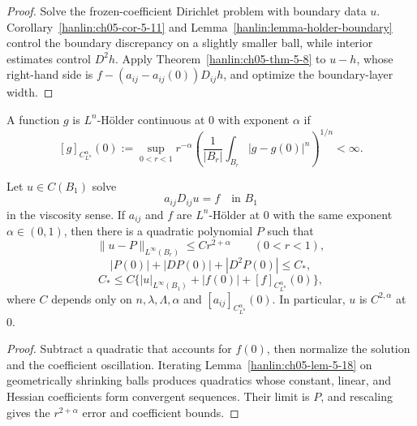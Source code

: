 \begin{proof}
\sketch Solve the frozen-coefficient Dirichlet problem with boundary data
$u$. Corollary~\ref{hanlin:ch05-cor-5-11} and
Lemma~\ref{hanlin:lemma-holder-boundary} control the boundary discrepancy on a
slightly smaller ball, while interior estimates control $D^2h$. Apply
Theorem~\ref{hanlin:ch05-thm-5-8} to $u-h$, whose right-hand side is
$f-(a_{ij}-a_{ij}(0))D_{ij}h$, and optimize the boundary-layer width.
\end{proof}


\begin{definition}\label{hanlin:ch05-def-5-19}
A function $g$ is $L^n$-Hölder continuous at $0$ with exponent $\alpha$ if
\[
[g]_{C^\alpha_{L^n}}(0)
:=\sup_{0<r<1}r^{-\alpha}
\left(\frac1{|B_r|}\int_{B_r}|g-g(0)|^n\right)^{1/n}<\infty.
\]
\end{definition}

\begin{theorem}\label{hanlin:ch05-thm-5-20}
Let $u\in C(B_1)$ solve
\[
a_{ij}D_{ij}u=f\quad\text{in }B_1
\]
in the viscosity sense. If $a_{ij}$ and $f$ are $L^n$-Hölder at $0$ with
the same exponent $\alpha\in(0,1)$, then there is a quadratic polynomial
$P$ such that
\[
\|u-P\|_{L^\infty(B_r)}\leq Cr^{2+\alpha}\qquad(0<r<1),
\]
\[
|P(0)|+|DP(0)|+|D^2P(0)|\le C_*,
\]
\[
C_*\le C\{|u|_{L^\infty(B_1)}+|f(0)|+[f]_{C^\alpha_{L^n}}(0)\},
\]
where $C$ depends only on $n,\lambda,\Lambda,\alpha$ and
$[a_{ij}]_{C^\alpha_{L^n}}(0)$. In particular, $u$ is $C^{2,\alpha}$ at
$0$.
\end{theorem}

\begin{proof}
\sketch Subtract a quadratic that accounts for $f(0)$, then normalize the
solution and the coefficient oscillation. Iterating
Lemma~\ref{hanlin:ch05-lem-5-18} on geometrically shrinking balls produces
quadratics whose constant, linear, and Hessian coefficients form convergent
sequences. Their limit is $P$, and rescaling gives the $r^{2+\alpha}$ error
and coefficient bounds.
\end{proof}


